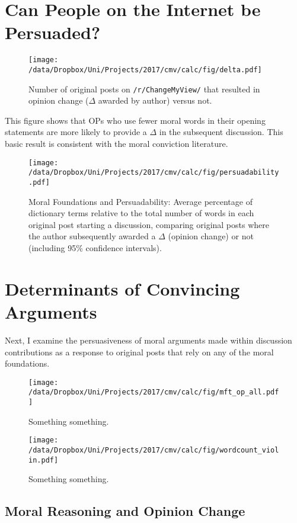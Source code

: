 \section{Can People on the Internet be Persuaded?}


\begin{figure}[ht]
\centering
\texttt{[image: /data/Dropbox/Uni/Projects/2017/cmv/calc/fig/delta.pdf]}
\caption{Number of original posts on \texttt{/r/ChangeMyView/} that resulted in opinion change ($\Delta$ awarded by author) versus not.}
\end{figure}

This figure shows that OPs who use fewer moral words in their opening statements are more likely to provide a \(\Delta\) in the subsequent discussion. This basic result is consistent with the moral conviction literature.

\begin{figure}[ht]
\centering
\texttt{[image: /data/Dropbox/Uni/Projects/2017/cmv/calc/fig/persuadability.pdf]}
\caption[Moral Foundations and Persuadability]{Moral Foundations and Persuadability: Average percentage of dictionary terms relative to the total number of words in each original post starting a discussion, comparing original posts where the author subsequently awarded a $\Delta$ (opinion change) or not (including 95\% confidence intervals).}
\end{figure}


\section{Determinants of Convincing Arguments}

Next, I examine the persuasiveness of moral arguments made within discussion contributions as a response to original posts that rely on any of the moral foundations.

\begin{figure}[ht]
\centering
\texttt{[image: /data/Dropbox/Uni/Projects/2017/cmv/calc/fig/mft\_op\_all.pdf]}
\caption{Something something.}
\end{figure}


\begin{figure}[ht]
\centering
\texttt{[image: /data/Dropbox/Uni/Projects/2017/cmv/calc/fig/wordcount\_violin.pdf]}
\caption{Something something.}
\end{figure}


\subsection{Moral Reasoning and Opinion Change}

